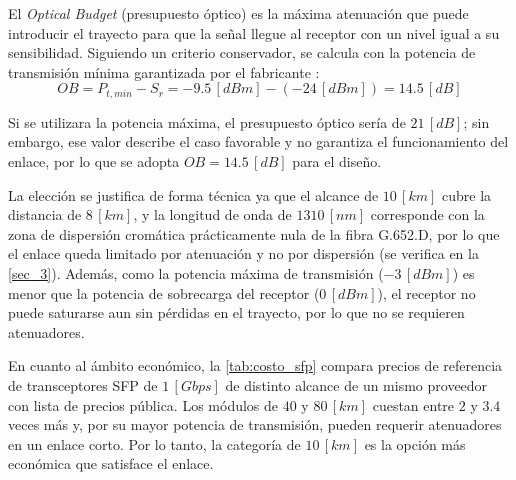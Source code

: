 El \textit{Optical Budget} (presupuesto óptico) es la máxima atenuación que puede introducir el trayecto para que la señal llegue al receptor con un nivel igual a su sensibilidad. Siguiendo un criterio conservador, se calcula con la potencia de transmisión mínima garantizada por el fabricante \cite{b7}:
\begin{equation}
    OB = P_{t,min} - S_r = -9.5 \, [dBm] - (-24 \, [dBm]) = 14.5 \, [dB]
    \label{eq:optical_budget}
\end{equation}

Si se utilizara la potencia máxima, el presupuesto óptico sería de $21 \, [dB]$; sin embargo, ese valor describe el caso favorable y no garantiza el funcionamiento del enlace, por lo que se adopta $OB = 14.5 \, [dB]$ para el diseño.

La elección se justifica de forma técnica ya que el alcance de $10 \, [km]$ cubre la distancia de $8 \, [km]$, y la longitud de onda de $1310 \, [nm]$ corresponde con la zona de dispersión cromática prácticamente nula de la fibra G.652.D, por lo que el enlace queda limitado por atenuación y no por dispersión (se verifica en la \autoref{sec_3}). Además, como la potencia máxima de transmisión ($-3 \, [dBm]$) es menor que la potencia de sobrecarga del receptor ($0 \, [dBm]$), el receptor no puede saturarse aun sin pérdidas en el trayecto, por lo que no se requieren atenuadores.

En cuanto al ámbito económico, la \autoref{tab:costo_sfp} compara precios de referencia de transceptores SFP de $1 \, [Gbps]$ de distinto alcance de un mismo proveedor con lista de precios pública. Los módulos de $40$ y $80 \, [km]$ cuestan entre $2$ y $3.4$ veces más y, por su mayor potencia de transmisión, pueden requerir atenuadores en un enlace corto. Por lo tanto, la categoría de $10 \, [km]$ es la opción más económica que satisface el enlace.

